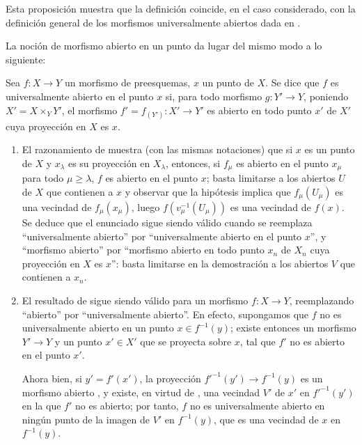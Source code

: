 Esta proposición muestra que la definición  coincide, en el caso considerado, con la definición general de los morfismos universalmente abiertos dada en .

La noción de morfismo abierto en un punto  da lugar del mismo modo a lo siguiente:

\begin{definition}[14.3.3]
\label{IV.14.3.3}
Sea $f:X\to Y$ un morfismo de preesquemas, $x$ un punto de $X$.
Se dice que $f$ es universalmente abierto en el punto $x$ si, para todo morfismo $g:Y'\to Y$, poniendo $X'=X\times_Y Y'$, el morfismo $f'=f_{(Y')}:X'\to Y'$ es abierto en todo punto $x'$ de $X'$ cuya proyección en $X$ es $x$.
\end{definition}

\begin{remarks}[14.3.3.1]
\label{IV.14.3.3.1}
\begin{enumerate}[label=(\roman*)]
  \item El razonamiento de  muestra (con las mismas notaciones) que si $x$ es un punto de $X$ y $x_\lambda$ es su proyección en $X_\lambda$, entonces, si $f_\mu$ es abierto en el punto $x_\mu$ para todo $\mu\geq\lambda$, $f$ es abierto en el punto $x$; basta limitarse a los abiertos $U$ de $X$ que contienen a $x$ y observar que la hipótesis implica que $f_\mu(U_\mu)$ es una vecindad de $f_\mu(x_\mu)$, luego $f(v_\mu^{-1}(U_\mu))$ es una vecindad de $f(x)$.
  Se deduce que el enunciado  sigue siendo válido cuando se reemplaza ``universalmente abierto'' por ``universalmente abierto en el punto $x$'', y ``morfismo abierto'' por ``morfismo abierto en todo punto $x_n$ de $X_n$ cuya proyección en $X$ es $x$'': basta limitarse en la demostración a los abiertos $V$ que contienen a $x_n$.

  \item El resultado de  sigue siendo válido para un morfismo $f:X\to Y$, reemplazando ``abierto'' por ``universalmente abierto''.
  En efecto, supongamos que $f$ no es universalmente abierto en un punto $x\in f^{-1}(y)$; existe entonces un morfismo $Y'\to Y$ y un punto $x'\in X'$ que se proyecta sobre $x$, tal que $f'$ no es abierto en el punto $x'$.


Ahora bien, si $y'=f'(x')$, la proyección $f'^{-1}(y')\to f^{-1}(y)$ es un morfismo abierto , y existe, en virtud de , una vecindad $V'$ de $x'$ en $f'^{-1}(y')$ en la que $f'$ no es abierto; por tanto, $f$ no es universalmente abierto en ningún punto de la imagen de $V'$ en $f^{-1}(y)$, que es una vecindad de $x$ en $f^{-1}(y)$.
\end{enumerate}
\end{remarks}

